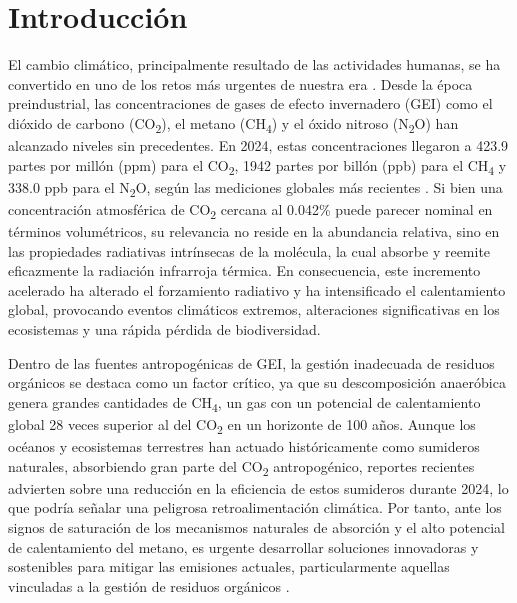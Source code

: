 \chapter{Introducción}

El cambio climático, principalmente resultado de las actividades humanas, se ha convertido en uno de los retos más urgentes de nuestra era \parencite{allanSummaryPolicymakers2023}. Desde la época preindustrial, las concentraciones de gases de efecto invernadero (GEI) como el dióxido de carbono (CO\textsubscript{2}), el metano (CH\textsubscript{4}) y el óxido nitroso (N\textsubscript{2}O) han alcanzado niveles sin precedentes. En 2024, estas concentraciones llegaron a 423.9 partes por millón (ppm) para el CO\textsubscript{2}, 1942 partes por billón (ppb) para el CH\textsubscript{4} y 338.0 ppb para el N\textsubscript{2}O, según las mediciones globales más recientes \parencite{ak-bhdWEATHERCLIMATEWATER}. Si bien una concentración atmosférica de CO\textsubscript{2} cercana al 0.042\% puede parecer nominal en términos volumétricos, su relevancia no reside en la abundancia relativa, sino en las propiedades radiativas intrínsecas de la molécula, la cual absorbe y reemite eficazmente la radiación infrarroja térmica. En consecuencia, este incremento acelerado ha alterado el forzamiento radiativo y ha intensificado el calentamiento global, provocando eventos climáticos extremos, alteraciones significativas en los ecosistemas y una rápida pérdida de biodiversidad. 

Dentro de las fuentes antropogénicas de GEI, la gestión inadecuada de residuos orgánicos se destaca como un factor crítico, ya que su descomposición anaeróbica genera grandes cantidades de CH\textsubscript{4}, un gas con un potencial de calentamiento global 28 veces superior al del CO\textsubscript{2} en un horizonte de 100 años. Aunque los océanos y ecosistemas terrestres han actuado históricamente como sumideros naturales, absorbiendo gran parte del CO\textsubscript{2} antropogénico, reportes recientes advierten sobre una reducción en la eficiencia de estos sumideros durante 2024, lo que podría señalar una peligrosa retroalimentación climática. Por tanto, ante los signos de saturación de los mecanismos naturales de absorción y el alto potencial de calentamiento del metano, es urgente desarrollar soluciones innovadoras y sostenibles para mitigar las emisiones actuales, particularmente aquellas vinculadas a la gestión de residuos orgánicos \parencite{oecdFoodLossWaste2025}.

